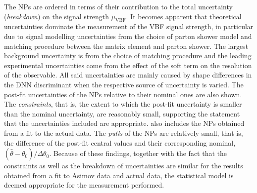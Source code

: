 The NPs are ordered in terms of their contribution to the total uncertainty (\emph{breakdown}) on the signal strength $\mu_{\mathrm{VBF}}$. 
It becomes apparent that theoretical uncertainties dominate the measurement of the VBF signal strength, in particular due to signal modelling uncertainties from the choice of parton shower model and matching procedure between the matrix element and parton shower. 
The largest background uncertainty is from the choice of \ttbar matching procedure and the leading experimental uncertainties come from the effect of the \MET soft term on the resolution of the \MET observable.  
All said uncertainties are mainly caused by shape differences in the DNN discriminant when the respective source of uncertainty is varied.
The post-fit uncertainties of the NPs relative to their nominal ones are also shown. The \emph{constraints}, that is, the extent to which the post-fit uncertainty is smaller than the nominal uncertainty, are reasonably small, supporting the statement that the uncertainties included are appropriate. 
 also includes the NPs obtained from a fit to the actual data. 
The \emph{pulls} of the NPs are relatively small, that is, the difference of the post-fit central values and their corresponding nominal, $(\hat{\theta} - \theta_0 ) / \Delta \theta_0$.
Because of these findings, together with the fact that the constraints as well as the breakdown of uncertainties are similar for the results obtained from a fit to Asimov data and actual data, the statistical model is deemed appropriate for the measurement performed. 





